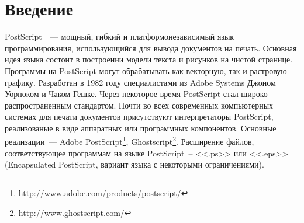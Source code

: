 \documentclass[14pt]{extarticle}
\renewcommand\baselinestretch{1.5}
\begin{document}

\tableofcontents
\thispagestyle{empty} 
\pagebreak



\section*{Введение}
PostScript~\cite{PLRM}~--- мощный, гибкий и платформонезависимый язык программирования, использующийся для вывода документов на печать. Основная идея языка состоит в построении модели текста и рисунков на чистой странице. Программы на PostScript могут обрабатывать как векторную, так и растровую графику. Разработан в 1982 году специалистами из Adobe Systems Джоном Уорноком и Чаком Гешке. Через некоторое время PostScript стал широко распространенным стандартом. Почти во всех современных компьютерных системах для печати документов присутствуют интерпретаторы PostScript, реализованые в виде аппаратных или программных компонентов. Основные реализации~--- Adobe PostScript\footnote{\url{http://www.adobe.com/products/postscript/}}, Ghostscript\footnote{\url{http://www.ghostscript.com/}}. Расширение файлов, соответствующее программам на языке PostScript~-- <<.ps>> или <<.eps>> (Encapsulated PostScript, вариант языка с некоторыми ограничениями).
\end{document}
